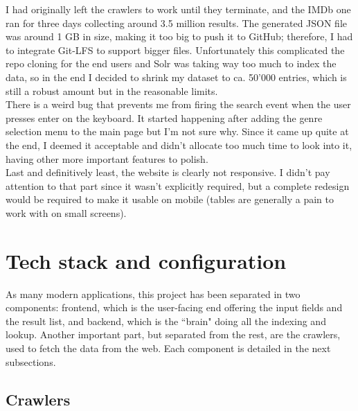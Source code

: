 \documentclass[12pt]{article}
\begin{document}
		I had originally left the crawlers to work until they terminate, and the IMDb one ran for three days collecting around 3.5 million results. The generated JSON file was around 1 GB in size, making it too big to push it to GitHub; therefore, I had to integrate Git-LFS to support bigger files. Unfortunately this complicated the repo cloning for the end users and Solr was taking way too much to index the data, so in the end I decided to shrink my dataset to ca. 50'000 entries, which is still a robust amount but in the reasonable limits.\\
		
		There is a weird bug that prevents me from firing the search event when the user presses enter on the keyboard. It started happening after adding the genre selection menu to the main page but I'm not sure why. Since it came up quite at the end, I deemed it acceptable and didn't allocate too much time to look into it, having other more important features to polish.\\
	
		Last and definitively least, the website is clearly not responsive. I didn't pay attention to that part since it wasn't explicitly required, but a complete redesign would be required to make it usable on mobile (tables are generally a pain to work with on small screens).
	
	\newpage
	
	
\section{Tech stack and configuration}

	As many modern applications, this project has been separated in two components: frontend, which is the user-facing end offering the input fields and the result list, and backend, which is the ``brain" doing all the indexing and lookup. Another important part, but separated from the rest, are the crawlers, used to fetch the data from the web. Each component is detailed in the next subsections.
	
	\subsection{Crawlers}
	
\end{document}
